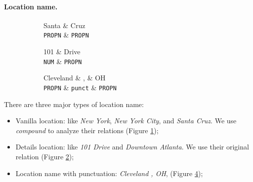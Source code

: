 \documentclass[11pt,a4paper]{article}
\begin{document}
\paragraph{Location name.}
\begin{figure}[t]
	\begin{subfigure}[t]{0.3\columnwidth}
		\centering
		\small
		\begin{dependency}[edge slant=2, text only label, label style=above]
			\begin{deptext}
				Santa \& Cruz \\
				\texttt{PROPN} \& \texttt{PROPN} \\
			\end{deptext}
		\end{dependency}
		\caption{}\label{fig:loc-name:vanilla}
	\end{subfigure}
	\begin{subfigure}[t]{0.3\columnwidth}
		\centering
		\small
		\begin{dependency}[edge slant=2, text only label, label style=above]
			\begin{deptext}
				101 \& Drive \\
				\texttt{NUM} \& \texttt{PROPN} \\
			\end{deptext}
		\end{dependency}
		\caption{}\label{fig:loc-name:comp}
	\end{subfigure}
	\begin{subfigure}[t]{0.3\columnwidth}
		\centering
		\small
		\begin{dependency}[edge slant=2, text only label, label style=above]
			\begin{deptext}
				Cleveland \& , \& OH \\
				\texttt{PROPN} \& \texttt{punct} \& \texttt{PROPN} \\
			\end{deptext}
		\end{dependency}
		\caption{}\label{fig:loc-name:punct}
	\end{subfigure}
\end{figure}
There are three major types of location name:
\begin{itemize}
	\item Vanilla location: like \textit{New York}, \textit{New York City}, and \textit{Santa Cruz}. 
	We use \textit{compound} to analyze their relations (Figure \ref{fig:loc-name:vanilla});
	\item Details location: like \textit{101 Drive} and \textit{Downtown Atlanta}.
	We use their original relation (Figure \ref{fig:loc-name:comp});
	\item Location name with punctuation: \textit{Cleveland , OH}, (Figure \ref{fig:loc-name:punct});
\end{itemize}
\end{document}
